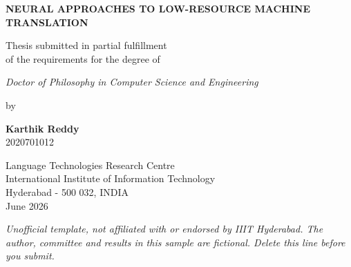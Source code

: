 \begin{titlepage}
\centering
\begin{singlespace}
\vspace*{0.4in}
{\large\bfseries\MakeUppercase{Neural Approaches to Low-Resource Machine Translation}\par}
\vspace{0.8in}
Thesis submitted in partial fulfillment\\
of the requirements for the degree of\par\vspace{0.2in}
{\itshape Doctor of Philosophy in Computer Science and Engineering}\par\vspace{0.3in}
by\par\vspace{0.1in}
{\bfseries Karthik Reddy}\\
2020701012\par\vspace{0.8in}
Language Technologies Research Centre\\
International Institute of Information Technology\\
Hyderabad - 500 032, INDIA\\
June 2026
\end{singlespace}
\vfill
{\footnotesize\itshape Unofficial template, not affiliated with or endorsed by IIIT Hyderabad. The author, committee and results in this sample are fictional. Delete this line before you submit.}
\end{titlepage}
